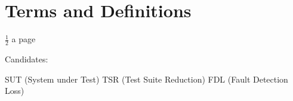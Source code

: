 
\chapter{Terms and Definitions}\label{chapter:terms}

$\frac{1}{2}$ a page

Candidates:

SUT (System under Test)
TSR (Test Suite Reduction)
FDL (Fault Detection Loss)
